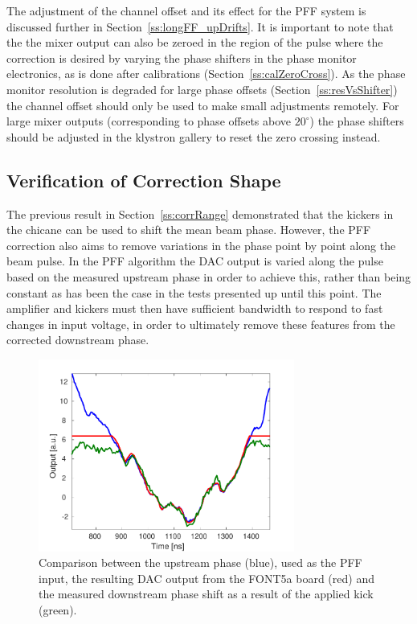 The adjustment of the channel offset and its effect for the PFF system is discussed further in Section~\ref{ss:longFF_upDrifts}. It is important to note that the the mixer output can also be zeroed in the region of the pulse where the correction is desired by varying the phase shifters in the phase monitor electronics, as is done after calibrations (Section~\ref{ss:calZeroCross}). As the phase monitor resolution is degraded for large phase offsets (Section~\ref{ss:resVsShifter}) the channel offset should only be used to make small adjustments remotely. For large mixer outputs (corresponding to phase offsets above \(20^\circ\)) the phase shifters should be adjusted in the klystron gallery to reset the zero crossing instead.  

\subsection{Verification of Correction Shape}
\label{ss:kickShape}

The previous result in Section~\ref{ss:corrRange} demonstrated that the kickers in the chicane can be used to shift the mean beam phase. However, the PFF correction also aims to remove variations in the phase point by point along the beam pulse. In the PFF algorithm the DAC output is varied along the pulse based on the measured upstream phase in order to achieve this, rather than being constant as has been the case in the tests presented up until this point. The amplifier and kickers must then have sufficient bandwidth to respond to fast changes in input voltage, in order to ultimately remove these features from the corrected downstream phase.

\begin{figure}
  \centering
  \includegraphics[width=0.75\textwidth]{Figures/commissioning/pffKickShape}
  \caption{Comparison between the upstream phase (blue), used as the PFF input, the resulting DAC output from the FONT5a board (red) and the measured downstream phase shift as a result of the applied kick (green).}
  \label{f:pffKickShape}
\end{figure}


